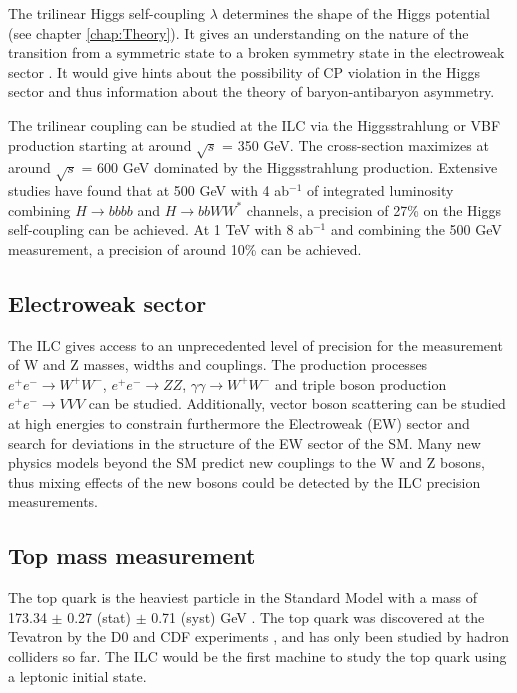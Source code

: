 The trilinear Higgs self-coupling $\lambda$ determines the shape of the Higgs potential (see chapter \ref{chap:Theory}). It gives an understanding on the nature of the transition from a symmetric state to a broken symmetry state in the electroweak sector \cite{Kajantie:1996mn}. It would give hints about the possibility of CP violation in the Higgs sector and thus information about the theory of baryon-antibaryon asymmetry.

The trilinear coupling can be studied at the ILC via the Higgsstrahlung or VBF production starting at around $\sqrt{s}$ = 350 GeV. The cross-section maximizes at around $\sqrt{s}$ = 600 GeV dominated by the Higgsstrahlung production. Extensive studies \cite{Duerig:2016dvi, Tian:2013qmi} have found that at 500 GeV with 4 ab$^{-1}$ of integrated luminosity combining $H \rightarrow bbbb$ and $H \rightarrow bbWW^*$ channels, a precision of 27\% on the Higgs self-coupling can be achieved. At 1 TeV with 8 ab$^{-1}$ and combining the 500 GeV measurement, a precision of around 10\% can be achieved.

\subsection{Electroweak sector}

The ILC gives access to an unprecedented level of precision for the measurement of W and Z masses, widths and couplings. The production processes $e^+e^- \rightarrow W^+W^-$, $e^+e^- \rightarrow ZZ$, $\gamma\gamma \rightarrow W^+W^-$ and triple boson production $e^+e^- \rightarrow VVV$ can be studied. Additionally, vector boson scattering can be studied at high energies to constrain furthermore the Electroweak (EW) sector and search for deviations in the structure of the EW sector of the SM. Many new physics models beyond the SM predict new couplings to the W and Z bosons, thus mixing effects of the new bosons could be detected by the ILC precision measurements.

\subsection{Top mass measurement}

The top quark is the heaviest particle in the Standard Model with a mass of 173.34 $\pm$ 0.27 (stat) $\pm$ 0.71 (syst) GeV \cite{ATLAS:2014wva}. The top quark was discovered at the Tevatron by the D0 and CDF experiments \cite{Abe:1995hr, D0:1995jca}, and has only been studied by hadron colliders so far. The ILC would be the first machine to study the top quark using a leptonic initial state.

